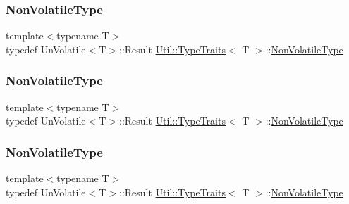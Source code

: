 \subsubsection{\texorpdfstring{NonVolatileType}{NonVolatileType}\hspace{0.1cm}{\footnotesize\ttfamily [1/3]}}
{\footnotesize\ttfamily template$<$typename T$>$ \\
typedef Un\+Volatile$<$T$>$\+::Result \mbox{\hyperlink{classUtil_1_1TypeTraits}{Util\+::\+Type\+Traits}}$<$ T $>$\+::\mbox{\hyperlink{classUtil_1_1TypeTraits_a8ffbb0166d5a321e021ac2171f2d4981}{Non\+Volatile\+Type}}}

\mbox{\label{classUtil_1_1TypeTraits_a8ffbb0166d5a321e021ac2171f2d4981}} 
\subsubsection{\texorpdfstring{NonVolatileType}{NonVolatileType}\hspace{0.1cm}{\footnotesize\ttfamily [2/3]}}
{\footnotesize\ttfamily template$<$typename T$>$ \\
typedef Un\+Volatile$<$T$>$\+::Result \mbox{\hyperlink{classUtil_1_1TypeTraits}{Util\+::\+Type\+Traits}}$<$ T $>$\+::\mbox{\hyperlink{classUtil_1_1TypeTraits_a8ffbb0166d5a321e021ac2171f2d4981}{Non\+Volatile\+Type}}}

\mbox{\label{classUtil_1_1TypeTraits_a8ffbb0166d5a321e021ac2171f2d4981}} 
\subsubsection{\texorpdfstring{NonVolatileType}{NonVolatileType}\hspace{0.1cm}{\footnotesize\ttfamily [3/3]}}
{\footnotesize\ttfamily template$<$typename T$>$ \\
typedef Un\+Volatile$<$T$>$\+::Result \mbox{\hyperlink{classUtil_1_1TypeTraits}{Util\+::\+Type\+Traits}}$<$ T $>$\+::\mbox{\hyperlink{classUtil_1_1TypeTraits_a8ffbb0166d5a321e021ac2171f2d4981}{Non\+Volatile\+Type}}}

